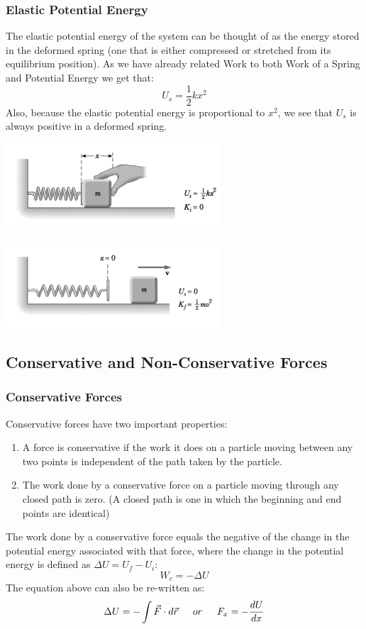 \documentclass{article}
\begin{document}
\subsubsection{Elastic Potential Energy}
The elastic potential energy of the system can be thought of as the energy stored in the deformed spring (one that is either compressed or stretched from its equilibrium position). As we have already related Work to both Work of a Spring and Potential Energy we get that:
\[
U_s=\frac{1}{2}kx^2
\]
Also, because the elastic potential energy is proportional to $x^2$, we see that $U_s$ is always positive in a deformed spring.
\begin{multicols}{2}
  \centerline{\includegraphics[width=8cm]{p1.png}}
  \columnbreak
  \centerline{\includegraphics[width=8cm]{p2.png}}
\end{multicols}
\subsection{Conservative and Non-Conservative Forces}
\subsubsection{Conservative Forces}
Conservative forces have two important properties:\\
\begin{enumerate}
\item A force is conservative if the work it does on a particle moving between any two points is independent of the path taken by the particle.
\item The work done by a conservative force on a particle moving through any closed path is zero. (A closed path is one in which the beginning and end points are identical)
\end{enumerate}
The work done by a conservative force equals the negative of the change in the potential energy associated with that force, where the change in the potential energy is defined as $\Delta U=U_f-U_i$:
\[
W_c=-\Delta U
\]
The equation above can also be re-written as:
\[
\Delta U=-\int \vec{F}\cdot d\vec{r} \indent
or \indent
F_x=-\frac{dU}{dx}
\]
\end{document}
